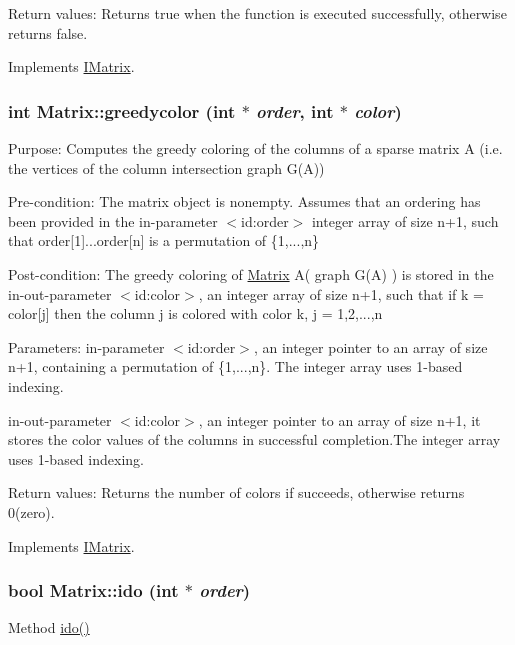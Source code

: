 Return values: Returns true when the function is executed successfully, otherwise returns false. 

Implements \hyperlink{classIMatrix}{IMatrix}.\hypertarget{classMatrix_a7ecfea6224fd953efa4a2add29307d0a}{
\subsubsection[{greedycolor}]{\setlength{\rightskip}{0pt plus 5cm}int Matrix::greedycolor (int $\ast$ {\em order}, \/  int $\ast$ {\em color})}}
\label{classMatrix_a7ecfea6224fd953efa4a2add29307d0a}
Purpose: Computes the greedy coloring of the columns of a sparse matrix A (i.e. the vertices of the column intersection graph G(A))

Pre-\/condition: The matrix object is nonempty. Assumes that an ordering has been provided in the in-\/parameter $<$id:order$>$ integer array of size n+1, such that order\mbox{[}1\mbox{]}...order\mbox{[}n\mbox{]} is a permutation of \{1,...,n\}

Post-\/condition: The greedy coloring of \hyperlink{classMatrix}{Matrix} A( graph G(A) ) is stored in the in-\/out-\/parameter $<$id:color$>$, an integer array of size n+1, such that if k = color\mbox{[}j\mbox{]} then the column j is colored with color k, j = 1,2,...,n

Parameters: in-\/parameter $<$id:order$>$, an integer pointer to an array of size n+1, containing a permutation of \{1,...,n\}. The integer array uses 1-\/based indexing.

in-\/out-\/parameter $<$id:color$>$, an integer pointer to an array of size n+1, it stores the color values of the columns in successful completion.The integer array uses 1-\/based indexing.

Return values: Returns the number of colors if succeeds, otherwise returns 0(zero). 

Implements \hyperlink{classIMatrix}{IMatrix}.\hypertarget{classMatrix_ab9bef57c1115e601cdeb493ecb381b82}{
\subsubsection[{ido}]{\setlength{\rightskip}{0pt plus 5cm}bool Matrix::ido (int $\ast$ {\em order})}}
\label{classMatrix_ab9bef57c1115e601cdeb493ecb381b82}
Method \hyperlink{classMatrix_ab9bef57c1115e601cdeb493ecb381b82}{ido()}

